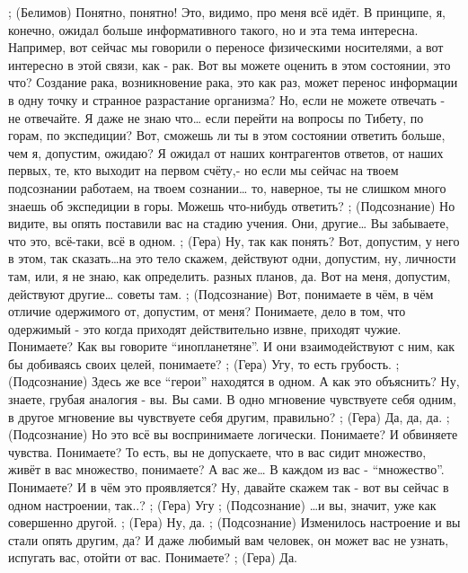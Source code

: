 ;	(Белимов) Понятно, понятно!  Это, видимо, про меня всё идёт. В принципе, я, конечно, ожидал больше информативного такого, но и эта тема интересна. Например, вот сейчас мы говорили о переносе физическими носителями, а вот интересно в этой связи, как - рак. Вот вы можете оценить в этом состоянии, это что? Создание рака, возникновение рака, это как раз, может перенос информации в одну точку и странное разрастание организма? Но, если не можете отвечать - не отвечайте. Я даже не знаю что… если перейти на вопросы по Тибету, по горам, по экспедиции? Вот, сможешь ли ты в этом состоянии ответить больше, чем я, допустим, ожидаю? Я ожидал от наших контрагентов  ответов, от наших первых, те, кто выходит на первом счёту,- но если мы сейчас на твоем подсознании работаем, на твоем сознании… то, наверное, ты не слишком много знаешь об экспедиции в горы. Можешь что-нибудь ответить?
;	(Подсознание) Но видите, вы опять поставили вас на стадию учения. Они, другие… Вы забываете, что это, всё-таки, всё в одном.
;	(Гера) Ну, так как понять? Вот, допустим, у него в этом, так сказать…на это тело скажем, действуют одни, допустим, ну, личности там, или, я не знаю, как определить. разных планов, да.  Вот на меня, допустим, действуют другие… советы там.
;	(Подсознание) Вот, понимаете в чём, в чём отличие одержимого от, допустим, от меня? Понимаете, дело в том, что одержимый - это когда приходят действительно извне, приходят чужие. Понимаете? Как вы говорите ``инопланетяне''. И они взаимодействуют с ним, как бы добиваясь своих целей, понимаете?
;	(Гера) Угу, то есть грубость.
;	(Подсознание) Здесь же все ``герои'' находятся в одном. А как это объяснить?  Ну, знаете, грубая аналогия - вы. Вы сами. В одно мгновение чувствуете себя одним, в другое мгновение вы чувствуете себя другим, правильно?
;	(Гера) Да, да, да.
;	(Подсознание) Но это всё вы воспринимаете логически. Понимаете? И обвиняете чувства. Понимаете? То есть, вы не допускаете, что в вас сидит множество, живёт в вас множество, понимаете? А вас же… В каждом из вас - ``множество''. Понимаете? И в чём это проявляется? Ну, давайте скажем так - вот вы сейчас в одном настроении, так..?
;	(Гера) Угу
;	(Подсознание) …и вы, значит, уже как совершенно другой. 
;	(Гера) Ну, да.
;	(Подсознание) Изменилось настроение и вы стали опять другим, да? И даже любимый вам человек, он может вас не узнать, испугать вас, отойти от вас. Понимаете?
;	(Гера) Да.
